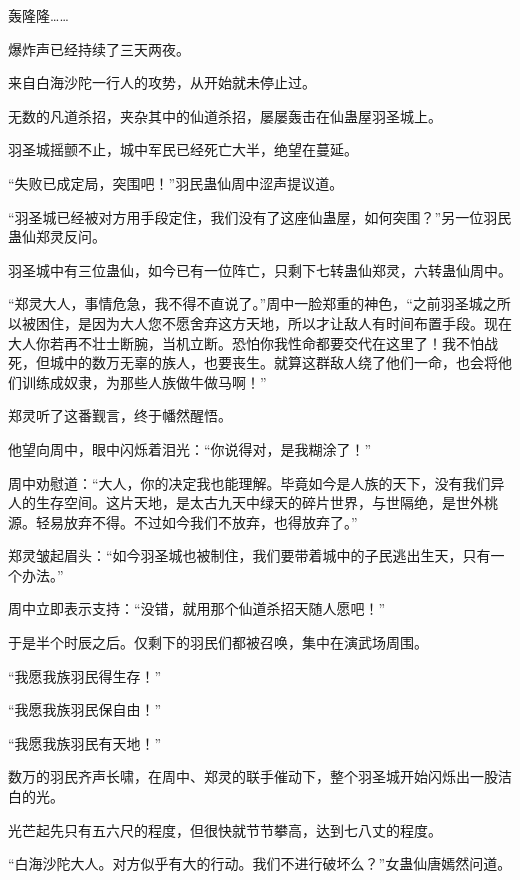 
\begin{this_body}

轰隆隆……

爆炸声已经持续了三天两夜。

来自白海沙陀一行人的攻势，从开始就未停止过。

无数的凡道杀招，夹杂其中的仙道杀招，屡屡轰击在仙蛊屋羽圣城上。

羽圣城摇颤不止，城中军民已经死亡大半，绝望在蔓延。

“失败已成定局，突围吧！”羽民蛊仙周中涩声提议道。

“羽圣城已经被对方用手段定住，我们没有了这座仙蛊屋，如何突围？”另一位羽民蛊仙郑灵反问。

羽圣城中有三位蛊仙，如今已有一位阵亡，只剩下七转蛊仙郑灵，六转蛊仙周中。

“郑灵大人，事情危急，我不得不直说了。”周中一脸郑重的神色，“之前羽圣城之所以被困住，是因为大人您不愿舍弃这方天地，所以才让敌人有时间布置手段。现在大人你若再不壮士断腕，当机立断。恐怕你我性命都要交代在这里了！我不怕战死，但城中的数万无辜的族人，也要丧生。就算这群敌人绕了他们一命，也会将他们训练成奴隶，为那些人族做牛做马啊！”

郑灵听了这番觐言，终于幡然醒悟。

他望向周中，眼中闪烁着泪光：“你说得对，是我糊涂了！”

周中劝慰道：“大人，你的决定我也能理解。毕竟如今是人族的天下，没有我们异人的生存空间。这片天地，是太古九天中绿天的碎片世界，与世隔绝，是世外桃源。轻易放弃不得。不过如今我们不放弃，也得放弃了。”

郑灵皱起眉头：“如今羽圣城也被制住，我们要带着城中的子民逃出生天，只有一个办法。”

周中立即表示支持：“没错，就用那个仙道杀招天随人愿吧！”

于是半个时辰之后。仅剩下的羽民们都被召唤，集中在演武场周围。

“我愿我族羽民得生存！”

“我愿我族羽民保自由！”

“我愿我族羽民有天地！”

数万的羽民齐声长啸，在周中、郑灵的联手催动下，整个羽圣城开始闪烁出一股洁白的光。

光芒起先只有五六尺的程度，但很快就节节攀高，达到七八丈的程度。

“白海沙陀大人。对方似乎有大的行动。我们不进行破坏么？”女蛊仙唐嫣然问道。


\end{this_body}
